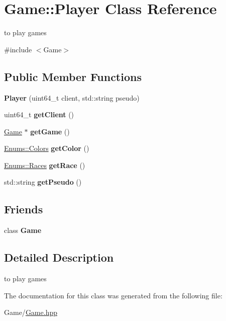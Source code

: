\hypertarget{class_game_1_1_player}{}\section{Game\+:\+:Player Class Reference}
\label{class_game_1_1_player}


to play games  




{\ttfamily \#include $<$Game$>$}

\subsection*{Public Member Functions}
\begin{DoxyCompactItemize}
\item 
\mbox{\label{class_game_1_1_player_a8c22860791607e709a9a5725ffe95a6b}} 
{\bfseries Player} (uint64\+\_\+t client, std\+::string pseudo)
\item 
\mbox{\label{class_game_1_1_player_a9ff9e096a6fb1c76995aee51c21f4819}} 
uint64\+\_\+t {\bfseries get\+Client} ()
\item 
\mbox{\label{class_game_1_1_player_af992b9161b4be80a09d108365c9b7551}} 
\hyperlink{class_game_1_1_game}{Game} $\ast$ {\bfseries get\+Game} ()
\item 
\mbox{\label{class_game_1_1_player_a06fb1109003f2e5768d4ce129e2007bd}} 
\hyperlink{_enums_8hpp_abb0511074ee3233e3e580a22e3890526}{Enums\+::\+Colors} {\bfseries get\+Color} ()
\item 
\mbox{\label{class_game_1_1_player_a6f8b71238c37fa8ee283132ac838a259}} 
\hyperlink{_enums_8hpp_a04ca481553f9a4e7ed98901dbf50951f}{Enums\+::\+Races} {\bfseries get\+Race} ()
\item 
\mbox{\label{class_game_1_1_player_a0a97a842804b68b84482ad8eec2a8605}} 
std\+::string {\bfseries get\+Pseudo} ()
\end{DoxyCompactItemize}
\subsection*{Friends}
\begin{DoxyCompactItemize}
\item 
\mbox{\label{class_game_1_1_player_aa2fab026580d6f14280c2ffb8063a314}} 
class {\bfseries Game}
\end{DoxyCompactItemize}


\subsection{Detailed Description}
to play games 

The documentation for this class was generated from the following file\+:\begin{DoxyCompactItemize}
\item 
Game/\hyperlink{_game_8hpp}{Game.\+hpp}\end{DoxyCompactItemize}
